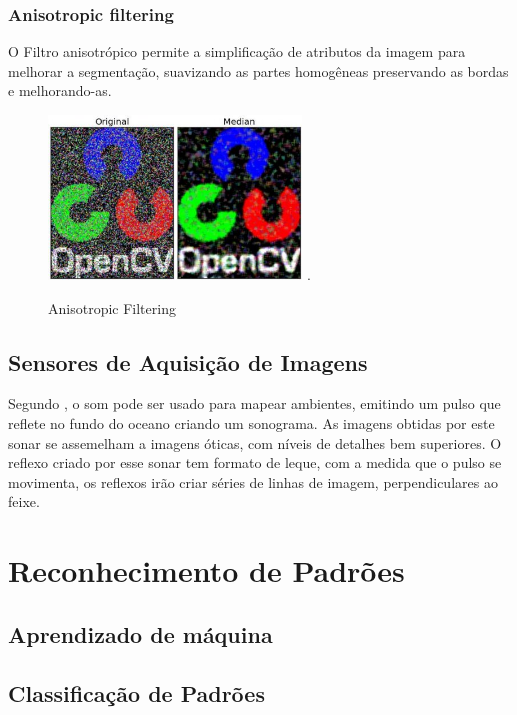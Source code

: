     \[
    \]
    

\subsubsection{Anisotropic filtering}
O Filtro anisotrópico permite a simplificação de atributos da imagem para melhorar a segmentação,  suavizando as partes homogêneas preservando as bordas e melhorando-as.

 \begin{figure}[H]
	\centering
    	\caption{\label{fig:anisifilter}Anisotropic Filtering}
		\includegraphics[width = 0.6\textwidth]	{resources/anisifilter}
    	.
\end{figure}

\subsection{Sensores de Aquisição de Imagens}
Segundo , o som pode ser usado para mapear ambientes, emitindo um pulso que reflete no fundo do oceano criando um sonograma. As imagens obtidas por este sonar se assemelham a imagens óticas, com níveis de detalhes bem superiores. O reflexo criado por esse sonar tem formato de leque, com a medida que o pulso se movimenta, os reflexos irão criar séries de linhas de imagem, perpendiculares ao feixe.  

\section{Reconhecimento de Padrões}


\subsection{Aprendizado de máquina} 


\subsection{Classificação de Padrões}

    

